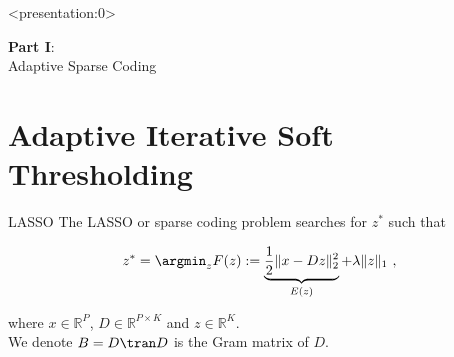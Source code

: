 \documentclass[defense.tex]{subfiles}
\begin{document}
\begin{frame}<presentation:0>{}

\centering\Huge {\color{darkred}\textbf {Part I}}:\\
Adaptive Sparse Coding\\
\biblio{}
	
\end{frame}


\section{Adaptive Iterative Soft Thresholding}
\label{sec:adapt}


\begin{frame}{LASSO}
	The LASSO or sparse coding problem searches for $z^*$ such that 
	
	\begin{equation}
        \label{eq:lasso}
        z^* = \argmin_z F(z) := \underbrace{\frac{1}{2}\|x - Dz\|_ 2^2}_{E(z)} + \lambda\|z\|_1~,
	\end{equation}
	
	where $x \in \mathbb R^P$, $D \in \mathbb R^{P\times K}$ and $z \in \mathbb R^K$.\\[2em]

	
	We denote $B = D\tran D$ is the Gram matrix of $D$.
\end{frame}

\end{document}
